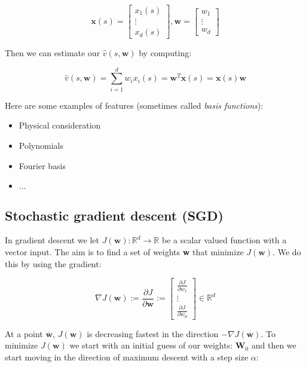 	\begin{equation}
		\textbf{x}(s) = \begin{bmatrix} x_1(s) \\ \vdots \\ x_d(s) \end{bmatrix}, \textbf{w} = \begin{bmatrix} w_1 \\ \vdots \\ w_d \end{bmatrix}
	\end{equation}

Then we can estimate our $\hat{v}(s,\textbf{w})$ by computing:

	\begin{equation}
		\hat{v}(s, \textbf{w}) = \sum_{i=1}^{d}w_ix_i(s) = \textbf{w}^{T}\textbf{x}(s) = \textbf{x}(s)\textbf{w}
	\end{equation}

Here are some examples of features (sometimes called \emph{basis functions}):

\begin{itemize}
	\item Physical consideration
	\item Polynomials
	\item Fourier basis
	\item $\ldots$
\end{itemize}

\subsection*{Stochastic gradient descent (SGD)}
In gradient descent we let $J(\textbf{w}): \mathbb{R}^{d} \rightarrow \mathbb{R}$ be a scalar valued function with a vector input. The aim is to find a set of weights \textbf{w} that minimize $J(\textbf{w})$. We do this by using the gradient:

	\begin{equation}
		\nabla J(\textbf{w}) := \frac{\partial J} {\partial \textbf{w}} := \begin{bmatrix} \frac{\partial J} {\partial w_1} \\ \vdots \\ \frac{\partial J} {\partial w_d}   \end{bmatrix} \in \mathbb{R}^{d}
	\end{equation}

At a point $\overline{\textbf{w}}$, $J(\textbf{w})$ is decreasing fastest in the direction $- \nabla J(\overline{\textbf{w}})$. To minimize $J(\textbf{w})$ we start with an initial guess of our weights: $\textbf{W}_0$ and then we start moving in the direction of maximum descent with a step size $\alpha$: 

